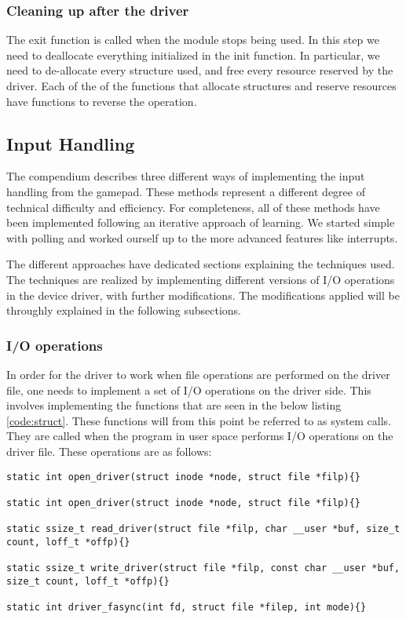 \subsubsection{Cleaning up after the driver}
The exit function is called when the module stops being used. In this step we need to deallocate everything initialized in the init function. In particular, we need to de-allocate every structure used, and free every resource reserved by the driver. Each of the of the functions that allocate structures and reserve resources have functions to reverse the operation.

\subsection{Input Handling}
The compendium describes three different ways of implementing the input handling from the gamepad. These methods represent a different degree of technical difficulty and efficiency. For completeness, all of these methods have been implemented following an iterative approach of learning. We started simple with polling and worked ourself up to the more advanced features like interrupts.

The different approaches have dedicated sections explaining the techniques used. The techniques are realized by implementing different versions of I/O operations in the device driver, with further modifications. The modifications applied will be throughly explained in the following subsections. 


\subsubsection{I/O operations}
In order for the driver to work when file operations are performed on the driver file, one needs to implement a set of I/O operations on the driver side. This involves implementing the functions that are seen in the below listing \ref{code:struct}. These functions will from this point be referred to as system calls. They are called when the program in user space performs I/O operations on the driver file. These operations are as follows: 

\begin{lstlisting}[caption=System calls, label=code:func]
static int open_driver(struct inode *node, struct file *filp){}

static int open_driver(struct inode *node, struct file *filp){}

static ssize_t read_driver(struct file *filp, char __user *buf, size_t count, loff_t *offp){}

static ssize_t write_driver(struct file *filp, const char __user *buf, size_t count, loff_t *offp){}

static int driver_fasync(int fd, struct file *filep, int mode){}
\end{lstlisting}




